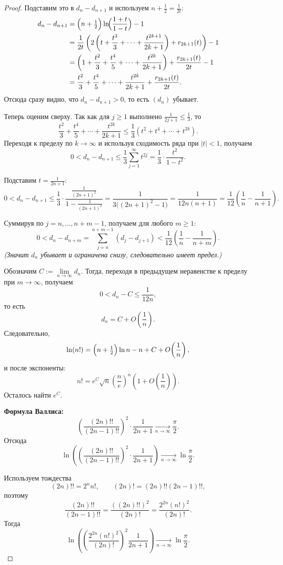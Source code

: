 \begin{proof}
	Подставим это в $d_n-d_{n+1}$ и используем $n+\tfrac12=\frac{1}{2t}$:
	\begin{align*}
		d_n-d_{n+1}
		&=\Bigl(n+\tfrac12\Bigr)\ln\!\Bigl(\frac{1+t}{1-t}\Bigr)-1 \\
		&= \frac{1}{2t}\left(2\left(t+\frac{t^3}{3}+\cdots+\frac{t^{2k+1}}{2k+1}\right)+r_{2k+1}(t)\right)-1 \\
		&=\left(1+\frac{t^2}{3}+\frac{t^4}{5}+\cdots+\frac{t^{2k}}{2k+1}\right)+\frac{r_{2k+1}(t)}{2t}-1 \\
		&=\frac{t^2}{3}+\frac{t^4}{5}+\cdots+\frac{t^{2k}}{2k+1}+\frac{r_{2k+1}(t)}{2t}.
	\end{align*}
	Отсюда сразу видно, что $d_n-d_{n+1}>0$, то есть $(d_n)$ убывает.
	
	Теперь оценим сверху. Так как для $j\ge1$ выполнено $\frac{1}{2j+1}\le \frac{1}{3}$, то
	\[
	\frac{t^2}{3}+\frac{t^4}{5}+\cdots+\frac{t^{2k}}{2k+1}
	\le \frac13\left(t^2+t^4+\cdots+t^{2k}\right).
	\]
	Переходя к пределу по $k\to\infty$ и используя сходимость ряда при $|t|<1$, получаем
	\[
	0<d_n-d_{n+1}
	\le \frac13\sum_{j=1}^{\infty} t^{2j}
	=\frac13\cdot \frac{t^2}{1-t^2}.
	\]
	
	Подставим $t=\frac{1}{2n+1}$:
	\[
	0<d_n-d_{n+1}
	\le \frac13\cdot \frac{\frac{1}{(2n+1)^2}}{1-\frac{1}{(2n+1)^2}}
	=\frac{1}{3\bigl((2n+1)^2-1\bigr)}
	=\frac{1}{12n(n+1)}
	=\frac{1}{12}\left(\frac1n-\frac1{n+1}\right).
	\]
	
	Суммируя по $j=n,\dots,n+m-1$, получаем для любого $m\ge1$:
	\[
	0<d_n-d_{n+m}
	=\sum_{j=n}^{n+m-1}(d_j-d_{j+1})
	<\frac{1}{12}\left(\frac1n-\frac1{n+m}\right).
	\]
	\emph{(Значит $d_n$ убывает и ограничена снизу, следовательно имеет предел.)}
	
	Обозначим $C:=\lim\limits_{n\to\infty} d_n$. Тогда, переходя в предыдущем неравенстве к пределу при $m\to\infty$, получаем
	\[
	0<d_n-C\le \frac{1}{12n},
	\]
	то есть
	\[
	d_n=C+O\!\left(\frac1n\right).
	\]
	Следовательно,
	\[
	\ln(n!)=\Bigl(n+\tfrac12\Bigr)\ln n-n+C+O\!\left(\frac1n\right),
	\]
	и после экспоненты:
	\[
	n!=e^{C}\sqrt{n}\left(\frac{n}{e}\right)^n\left(1+O\!\left(\frac1n\right)\right).
	\]
	Осталось найти $e^{C}$.
	
	\medskip
	\textbf{Формула Валлиса:}
	\[
	\left(\frac{(2n)!!}{(2n-1)!!}\right)^2\cdot\frac{1}{2n+1}
	\xrightarrow[n\to\infty]{}\frac{\pi}{2}.
	\]
	Отсюда
	\[
	\ln\left(\left(\frac{(2n)!!}{(2n-1)!!}\right)^2\cdot\frac{1}{2n+1}\right)
	\xrightarrow[n\to\infty]{}\ln\frac{\pi}{2}.
	\]
	
	Используем тождества
	\[
	(2n)!!=2^n n!,
	\qquad
	(2n)!=(2n)!!(2n-1)!!,
	\]
	поэтому
	\[
	\frac{(2n)!!}{(2n-1)!!}=\frac{((2n)!!)^2}{(2n)!}
	=\frac{2^{2n}(n!)^2}{(2n)!}.
	\]
	Тогда
	\[
	\ln\left(\left(\frac{2^{2n}(n!)^2}{(2n)!}\right)^2\frac{1}{2n+1}\right)
	\xrightarrow[n\to\infty]{}\ln\frac{\pi}{2}.
	\]
	

\end{proof}
